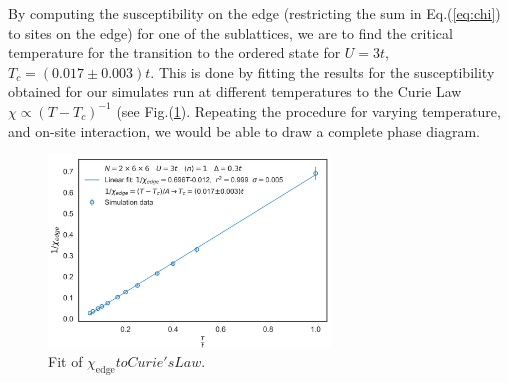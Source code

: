 By computing the susceptibility on the edge (restricting the sum in Eq.(\ref{eq:chi}) to sites on the edge) for one of the sublattices, we are to find the critical temperature for the transition to the ordered state for $U = 3 t$, $T_c = ( 0.017 \pm 0.003 ) t$.
This is done by fitting the results for the susceptibility obtained for our simulates run at different temperatures to the Curie Law $\chi \propto ( T - T_c )^{-1}$ (see Fig.(\ref{fig:chiFit}).
Repeating the procedure for varying temperature, and on-site interaction, we would be able to draw a complete phase diagram.
\begin{figure}[H]
  \centering
  \includegraphics[width=7.5cm]{images/fityang2017.png}
  \caption{Fit of $\chi_{\text{edge}} to Curie's Law$.}
  \label{fig:chiFit}
\end{figure}





